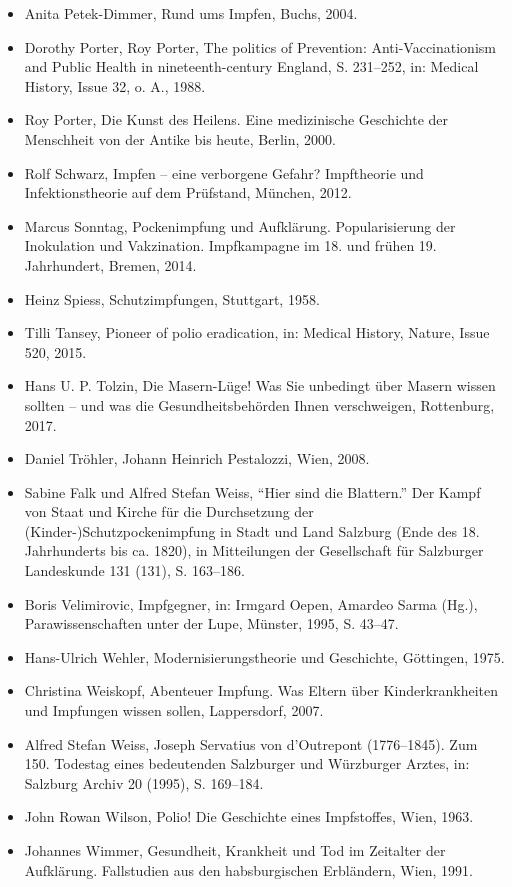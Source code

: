 \documentclass[
    a4paper,
    12pt,
    hyphens,
    chapterprefix=true,
    headheight=33pt,
    footheight=29pt,
    headings=optiontohead, %
]{scrartcl}
\begin{document}
{\begin{itemize}
\item{Anita Petek-Dimmer, Rund ums Impfen, Buchs, 2004.}
\item{Dorothy Porter, Roy Porter, The politics of Prevention: Anti-Vaccinationism and Public Health in nineteenth-century England, S. 231--252, in: Medical History, Issue 32, o. A., 1988.}
\item{Roy Porter, Die Kunst des Heilens. Eine medizinische Geschichte der Menschheit von der Antike bis heute, Berlin, 2000.}
\item{Rolf Schwarz, Impfen -- eine verborgene Gefahr? Impftheorie und Infektionstheorie auf dem Prüfstand, München, 2012.}
\item{Marcus Sonntag, Pockenimpfung und Aufklärung. Popularisierung der Inokulation und Vakzination. Impfkampagne im 18. und frühen 19. Jahrhundert, Bremen, 2014.}
\item{Heinz Spiess, Schutzimpfungen, Stuttgart, 1958.}
\item{Tilli Tansey, Pioneer of polio eradication, in: Medical History, Nature, Issue 520, 2015.}
\item{Hans U. P. Tolzin, Die Masern-Lüge! Was Sie unbedingt über Masern wissen sollten -- und was die Gesundheitsbehörden Ihnen verschweigen, Rottenburg, 2017.}
\item{Daniel Tröhler, Johann Heinrich Pestalozzi, Wien, 2008.}
\item{Sabine Falk und Alfred Stefan Weiss, "`Hier sind die Blattern."' Der Kampf von Staat und Kirche für die Durchsetzung der (Kinder-)Schutzpockenimpfung in Stadt und Land Salzburg (Ende des 18. Jahrhunderts bis ca. 1820), in Mitteilungen der Gesellschaft für Salzburger Landeskunde 131 (131), S. 163--186.}
\item{Boris Velimirovic, Impfgegner, in: Irmgard Oepen, Amardeo Sarma (Hg.), Parawissenschaften unter der Lupe, Münster, 1995, S. 43--47.}
\item{Hans-Ulrich Wehler, Modernisierungstheorie und Geschichte, Göttingen, 1975.}
\item{Christina Weiskopf, Abenteuer Impfung. Was Eltern über Kinderkrankheiten und Impfungen wissen sollen, Lappersdorf, 2007.}
\item{Alfred Stefan Weiss, Joseph Servatius von d'Outrepont (1776--1845). Zum 150. Todestag eines bedeutenden Salzburger und Würzburger Arztes, in: Salzburg Archiv 20 (1995), S. 169--184.}
\item{John Rowan Wilson, Polio! Die Geschichte eines Impfstoffes, Wien, 1963.}
\item{Johannes Wimmer, Gesundheit, Krankheit und Tod im Zeitalter der Aufklärung. Fallstudien aus den habsburgischen Erbländern, Wien, 1991.}

\end{itemize}}
\end{document}
